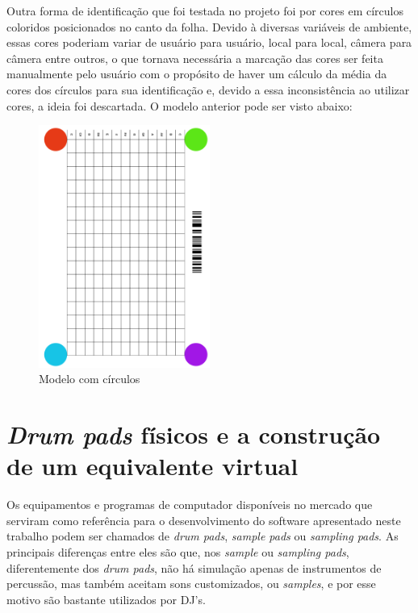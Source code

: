 \documentclass[12pt]{report}
\begin{document}
Outra forma de identificação que foi testada no projeto foi por cores
em círculos coloridos posicionados no canto da folha. Devido à
diversas variáveis de ambiente, essas cores poderiam variar de usuário
para usuário, local para local, câmera para câmera entre outros, o que
tornava necessária a marcação das cores ser feita manualmente pelo
usuário com o propósito de haver um cálculo da média da cores dos
círculos para sua identificação e, devido a essa inconsistência ao
utilizar cores, a ideia foi descartada. O modelo anterior pode ser
visto abaixo:

\begin{figure}[H]
  \centering
    \includegraphics[angle=90,origin=c,width=0.5\textwidth]{imagens/circulos.png}
    \caption{Modelo com círculos}
  \label{fig:circulos}
\end{figure}

\chapter{{\it Drum pads} físicos e a construção de um equivalente
  virtual}
\label{cha:drum_pads}

Os equipamentos e programas de computador disponíveis no mercado que
serviram como referência para o desenvolvimento do software
apresentado neste trabalho podem ser chamados de {\it drum pads}, {\it
  sample pads} ou {\it sampling pads}. As principais diferenças entre
eles são que, nos {\it sample} ou {\it sampling pads}, diferentemente
dos {\it drum pads}, não há simulação apenas de instrumentos de
percussão, mas também aceitam sons customizados, ou {\it samples}, e
por esse motivo são bastante utilizados por DJ's.
\end{document}
